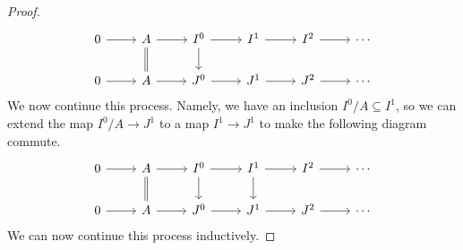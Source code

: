 \documentclass[../notes.tex]{subfiles}
\begin{document}
\begin{proof}
	\[\begin{tikzcd}
		0 & A & {I^0} & {I^1} & {I^2} & \cdots \\
		0 & A & {J^0} & {J^1} & {J^2} & \cdots
		\arrow[from=1-1, to=1-2]
		\arrow[from=1-2, to=1-3]
		\arrow[from=1-3, to=1-4]
		\arrow[from=1-4, to=1-5]
		\arrow[from=1-5, to=1-6]
		\arrow[from=2-1, to=2-2]
		\arrow[from=2-2, to=2-3]
		\arrow[from=2-3, to=2-4]
		\arrow[from=2-4, to=2-5]
		\arrow[from=2-5, to=2-6]
		\arrow[Rightarrow, no head, from=1-2, to=2-2]
		\arrow[from=1-3, to=2-3]
	\end{tikzcd}\]
	We now continue this process. Namely, we have an inclusion $I^0/A\subseteq I^1$, so we can extend the map $I^0/A\to J^1$ to a map $I^1\to J^1$ to make the following diagram commute.
	\[\begin{tikzcd}
		0 & A & {I^0} & {I^1} & {I^2} & \cdots \\
		0 & A & {J^0} & {J^1} & {J^2} & \cdots
		\arrow[from=1-1, to=1-2]
		\arrow[from=1-2, to=1-3]
		\arrow[from=1-3, to=1-4]
		\arrow[from=1-4, to=1-5]
		\arrow[from=1-5, to=1-6]
		\arrow[from=2-1, to=2-2]
		\arrow[from=2-2, to=2-3]
		\arrow[from=2-3, to=2-4]
		\arrow[from=2-4, to=2-5]
		\arrow[from=2-5, to=2-6]
		\arrow[Rightarrow, no head, from=1-2, to=2-2]
		\arrow[from=1-3, to=2-3]
		\arrow[from=1-4, to=2-4]
	\end{tikzcd}\]
	We can now continue this process inductively.


\end{proof}
\end{document}
